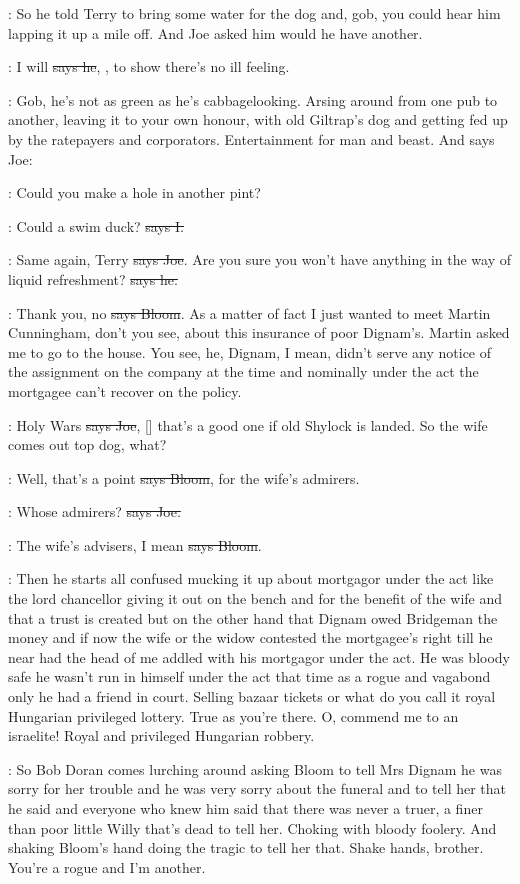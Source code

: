 \Nq:
So he told Terry to bring some water for the dog and, gob, you could
hear him lapping it up a mile off. And Joe asked him would he have
another.

\citizen:
I will \sout{says he}, ,
to show there's no ill feeling.

\Nq:
Gob, he's not as green as he's cabbagelooking. Arsing around from
one pub to another, leaving it to your own honour, with old Giltrap's dog
and getting fed up by the ratepayers and corporators. Entertainment for
man and beast. And says Joe:

\joe:
Could you make a hole in another pint?

:
Could a swim duck? \sout{says I.}

\joe:
Same again, Terry \sout{says Joe}.
Are you sure you won't have anything in the
way of liquid refreshment? \sout{says he.}

\Bloom:
Thank you, no \sout{says Bloom}.
As a matter of fact I just wanted to meet
Martin Cunningham, don't you see, about this insurance of poor Dignam's.
Martin asked me to go to the house. You see, he, Dignam, I mean, didn't
serve any notice of the assignment on the company at the time and
nominally under the act the mortgagee can't recover on the policy.

\joe:
Holy Wars \sout{says Joe},
[] that's a good one if old Shylock is
landed. So the wife comes out top dog, what?

\Bloom:
Well, that's a point \sout{says Bloom},
for the wife's admirers.

\joe:
Whose admirers? \sout{says Joe.}

\Bloom:
The wife's advisers, I mean \sout{says Bloom}.

\Nq:
Then he starts all confused mucking it up about mortgagor under the act
like the lord chancellor giving it out on the bench and for the benefit of
the wife and that a trust is created but on the other hand that Dignam
owed Bridgeman the money and if now the wife or the widow contested the
mortgagee's right till he near had the head of me addled with his
mortgagor under the act. He was bloody safe he wasn't run in himself under
the act that time as a rogue and vagabond only he had a friend in court.
Selling bazaar tickets or what do you call it royal Hungarian privileged
lottery. True as you're there. O, commend me to an israelite! Royal and
privileged Hungarian robbery.

\Nq:
So Bob Doran comes lurching around asking Bloom to tell Mrs
Dignam he was sorry for her trouble and he was very sorry about the
funeral and to tell her that he said and everyone who knew him said that
there was never a truer, a finer than poor little Willy that's dead to tell
her. Choking with bloody foolery. And shaking Bloom's hand doing the
tragic to tell her that. Shake hands, brother. You're a rogue and I'm
another.

